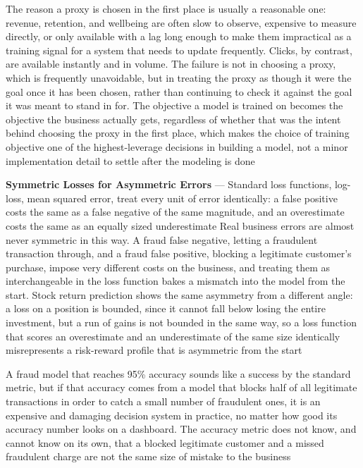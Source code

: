 The reason a proxy is chosen in the first place is usually a reasonable one:
revenue, retention, and wellbeing are often slow to observe, expensive to measure
directly, or only available with a lag long enough to make them impractical as a
training signal for a system that needs to update frequently. Clicks, by
contrast, are available instantly and in volume. The failure is not in choosing
a proxy, which is frequently unavoidable, but in treating the proxy as though it
were the goal once it has been chosen, rather than continuing to check it against
the goal it was meant to stand in for. The objective a model is trained on
becomes the objective the business actually gets, regardless of whether that was
the intent behind choosing the proxy in the first place, which makes the choice
of training objective one of the highest-leverage decisions in building a model,
not a minor implementation detail to settle after the modeling is done

\textbf{Symmetric Losses for Asymmetric Errors} --- Standard loss functions, log-loss,
mean squared error, treat every unit of error identically: a false positive costs
the same as a false negative of the same magnitude, and an overestimate costs
the same as an equally sized underestimate Real business errors are almost never
symmetric in this way. A fraud false negative, letting a fraudulent transaction
through, and a fraud false positive, blocking a legitimate customer's purchase, impose
very different costs on the business, and treating them as interchangeable in
the loss function bakes a mismatch into the model from the start. Stock return
prediction shows the same asymmetry from a different angle: a loss on a position
is bounded, since it cannot fall below losing the entire investment, but a run of
gains is not bounded in the same way, so a loss function that scores an
overestimate and an underestimate of the same size identically misrepresents a
risk-reward profile that is asymmetric from the start

A fraud model that reaches 95\% accuracy sounds like a success by the standard
metric, but if that accuracy comes from a model that blocks half of all legitimate
transactions in order to catch a small number of fraudulent ones, it is an
expensive and damaging decision system in practice, no matter how good its accuracy
number looks on a dashboard. The accuracy metric does not know, and cannot know on
its own, that a blocked legitimate customer and a missed fraudulent charge are
not the same size of mistake to the business

